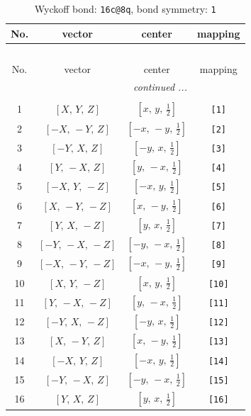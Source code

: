 \documentclass[fleqn,8pt]{jsarticle}
\begin{document}
\begin{longtable}{cccc}
\caption{Wyckoff bond: {\tt 16c@8q}, bond symmetry: {\tt 1}}
 \\
 \hline \hline
No. & vector & center & mapping \\ \hline \endfirsthead

\multicolumn{3}{l}{\tablename\ \thetable{}} \\
 \hline \hline
No. & vector & center & mapping \\ \hline \endhead

 \hline \hline
\multicolumn{3}{r}{\footnotesize\it continued ...} \\ \endfoot

 \hline \hline
\multicolumn{3}{r}{} \\ \endlastfoot

1 & $\left[ X,\, Y,\, Z \right]$ & $\left[ x,\, y,\, \frac{1}{2} \right]$ & {\tt [1]} \\ \hline
2 & $\left[ - X,\, - Y,\, Z \right]$ & $\left[ - x,\, - y,\, \frac{1}{2} \right]$ & {\tt [2]} \\ \hline
3 & $\left[ - Y,\, X,\, Z \right]$ & $\left[ - y,\, x,\, \frac{1}{2} \right]$ & {\tt [3]} \\ \hline
4 & $\left[ Y,\, - X,\, Z \right]$ & $\left[ y,\, - x,\, \frac{1}{2} \right]$ & {\tt [4]} \\ \hline
5 & $\left[ - X,\, Y,\, - Z \right]$ & $\left[ - x,\, y,\, \frac{1}{2} \right]$ & {\tt [5]} \\ \hline
6 & $\left[ X,\, - Y,\, - Z \right]$ & $\left[ x,\, - y,\, \frac{1}{2} \right]$ & {\tt [6]} \\ \hline
7 & $\left[ Y,\, X,\, - Z \right]$ & $\left[ y,\, x,\, \frac{1}{2} \right]$ & {\tt [7]} \\ \hline
8 & $\left[ - Y,\, - X,\, - Z \right]$ & $\left[ - y,\, - x,\, \frac{1}{2} \right]$ & {\tt [8]} \\ \hline
9 & $\left[ - X,\, - Y,\, - Z \right]$ & $\left[ - x,\, - y,\, \frac{1}{2} \right]$ & {\tt [9]} \\ \hline
10 & $\left[ X,\, Y,\, - Z \right]$ & $\left[ x,\, y,\, \frac{1}{2} \right]$ & {\tt [10]} \\ \hline
11 & $\left[ Y,\, - X,\, - Z \right]$ & $\left[ y,\, - x,\, \frac{1}{2} \right]$ & {\tt [11]} \\ \hline
12 & $\left[ - Y,\, X,\, - Z \right]$ & $\left[ - y,\, x,\, \frac{1}{2} \right]$ & {\tt [12]} \\ \hline
13 & $\left[ X,\, - Y,\, Z \right]$ & $\left[ x,\, - y,\, \frac{1}{2} \right]$ & {\tt [13]} \\ \hline
14 & $\left[ - X,\, Y,\, Z \right]$ & $\left[ - x,\, y,\, \frac{1}{2} \right]$ & {\tt [14]} \\ \hline
15 & $\left[ - Y,\, - X,\, Z \right]$ & $\left[ - y,\, - x,\, \frac{1}{2} \right]$ & {\tt [15]} \\ \hline
16 & $\left[ Y,\, X,\, Z \right]$ & $\left[ y,\, x,\, \frac{1}{2} \right]$ & {\tt [16]} \\
\end{longtable}
\end{document}
